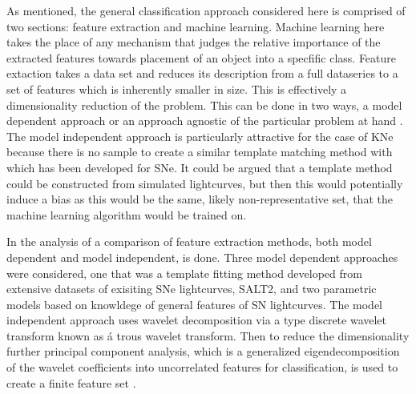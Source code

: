 \documentclass[12pt]{article}
\begin{document}
As mentioned, the general classification approach considered here is comprised of two sections: feature extraction and machine learning. Machine learning here takes the place of any mechanism that judges the relative importance of the extracted features towards placement of an object into a specfific class. Feature extaction takes a data set and reduces its description from a full dataseries to a set of features which is inherently smaller in size. This is effectively a dimensionality reduction of the problem. This can be done in two ways, a model dependent approach or an approach agnostic of the particular problem at hand \citep{Lochner2016}. The model independent approach is particularly attractive for the case of KNe because there is no sample to create a similar template matching method with which has been developed for SNe. It could be argued that a template method could be constructed from simulated lightcurves, but then this would potentially induce a bias as this would be the same, likely non-representative set, that the machine learning algorithm would be trained on.\par
In the analysis of \cite{Lochner2016} a comparison of feature extraction methods, both model dependent and model independent, is done. Three model dependent approaches were considered, one that was a template fitting method developed from extensive datasets of exisiting SNe lightcurves, SALT2, and two parametric models based on knowldege of general features of SN lightcurves. The model independent approach uses wavelet decomposition via a type discrete wavelet transform known as \'a trous wavelet transform. Then to reduce the dimensionality further principal component analysis, which is a generalized eigendecomposition of the wavelet coefficients into uncorrelated features for classification, is used to create a finite feature set \citep{Lochner2016}. \par
\end{document}
